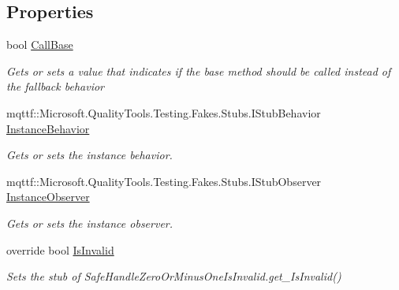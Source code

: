 \subsection*{Properties}
\begin{DoxyCompactItemize}
\item 
bool \hyperlink{class_system_1_1_runtime_1_1_interop_services_1_1_fakes_1_1_stub_safe_buffer_a8343f222974f734bca911a55c601781b}{Call\-Base}
\begin{DoxyCompactList}\small\item\em Gets or sets a value that indicates if the base method should be called instead of the fallback behavior\end{DoxyCompactList}\item 
mqttf\-::\-Microsoft.\-Quality\-Tools.\-Testing.\-Fakes.\-Stubs.\-I\-Stub\-Behavior \hyperlink{class_system_1_1_runtime_1_1_interop_services_1_1_fakes_1_1_stub_safe_buffer_aacfdc2f5d84af6154b05ea904d74755a}{Instance\-Behavior}
\begin{DoxyCompactList}\small\item\em Gets or sets the instance behavior.\end{DoxyCompactList}\item 
mqttf\-::\-Microsoft.\-Quality\-Tools.\-Testing.\-Fakes.\-Stubs.\-I\-Stub\-Observer \hyperlink{class_system_1_1_runtime_1_1_interop_services_1_1_fakes_1_1_stub_safe_buffer_a2b32c16b3bcfc3c0ff530913b7f87ce3}{Instance\-Observer}
\begin{DoxyCompactList}\small\item\em Gets or sets the instance observer.\end{DoxyCompactList}\item 
override bool \hyperlink{class_system_1_1_runtime_1_1_interop_services_1_1_fakes_1_1_stub_safe_buffer_a4d719a99a6517b9b7baef7d8c5ab93b7}{Is\-Invalid}
\begin{DoxyCompactList}\small\item\em Sets the stub of Safe\-Handle\-Zero\-Or\-Minus\-One\-Is\-Invalid.\-get\-\_\-\-Is\-Invalid()\end{DoxyCompactList}\end{DoxyCompactItemize}


